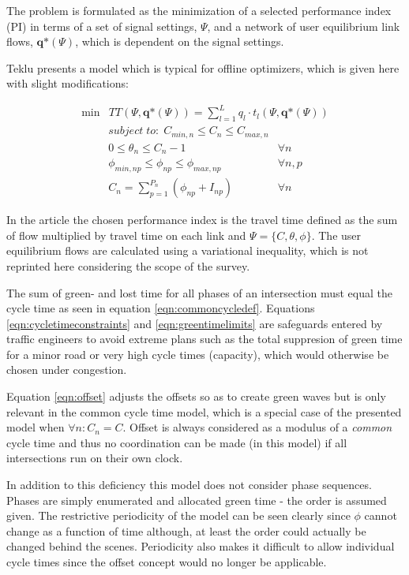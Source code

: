 The problem is formulated as the minimization of a selected performance index (PI) in terms of a set of signal settings, $\Psi$, and a network of user equilibrium link flows, $\textbf{q*}(\Psi)$, which is dependent on the signal settings.

Teklu \cite{2} presents a model which is typical for offline optimizers, which is given here with slight modifications:

\begin{eqnarray}
\min & TT(\Psi, \textbf{q*}\left( \Psi\right)) = \displaystyle\sum_{l = 1}^{L} q_l \cdot t_l(\Psi,\textbf{q*}(\Psi))
\end{eqnarray}
\begin{eqnarray}
\label{eqn:cycletimeconstraints} subject\;to:\;C_{min,n} \leq C_n \leq C_{max,n} & \\
\label{eqn:offset} 0 \leq \theta_n \leq C_n-1 & \forall n \\
\label{eqn:greentimelimits} \phi_{min,np} \leq \phi_{np} \leq \phi_{max,np} & \forall n,p \\
\label{eqn:commoncycledef} C_n = \sum_{p=1}^{P_n} ( \phi_{np} + I_{np} ) & \forall n
\end{eqnarray}

In the article the chosen performance index is the travel time defined as the sum of flow multiplied by travel time on each link and $\Psi = \lbrace C,\theta,\phi \rbrace$. The user equilibrium flows are calculated using a variational inequality, which is not reprinted here considering the scope of the survey.

The sum of green- and lost time for all phases of an intersection must equal the cycle time as seen in equation \ref{eqn:commoncycledef}. Equations \ref{eqn:cycletimeconstraints} and \ref{eqn:greentimelimits} are safeguards entered by traffic engineers to avoid extreme plans such as the total suppresion of green time for a minor road or very high cycle times (capacity), which would otherwise be chosen under congestion.

Equation \ref{eqn:offset} adjusts the offsets so as to create green waves but is only relevant in the common cycle time model, which is a special case of the presented model when $\forall n : C_n = C$. Offset is always considered as a modulus of a \textit{common} cycle time and thus no coordination can be made (in this model) if all intersections run on their own clock.

In addition to this deficiency this model does not consider phase sequences. Phases are simply enumerated and allocated green time - the order is assumed given. The restrictive periodicity of the model can be seen clearly since $\phi$ cannot change as a function of time although, at least the order could actually be changed behind the scenes. Periodicity also makes it difficult to allow individual cycle times since the offset concept would no longer be applicable.


